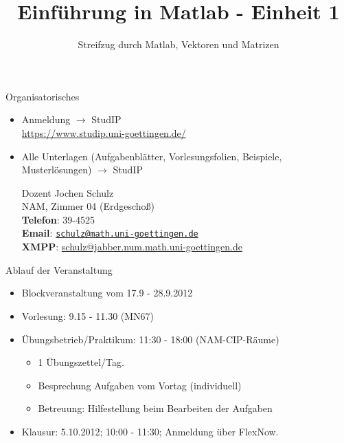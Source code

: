 \documentclass[hyperref={xetex}]{beamer}
\title{Einführung in Matlab - Einheit 1}
\subtitle{Streifzug durch Matlab, Vektoren und Matrizen}
\begin{document}
\titlepage


\begin{frame}{Organisatorisches}
\begin{itemize}
\item Anmeldung $\rightarrow$ StudIP \\
      \url{https://www.studip.uni-goettingen.de/}

{\color{blue}{Einführung in Matlab (Mathematische Anwendersysteme)}}
\item Alle Unterlagen (Aufgabenblätter, Vorlesungsfolien, Beispiele, Musterlösungen) $\rightarrow$ StudIP
\pause
\begin{block}{Dozent}
Jochen Schulz\\
NAM, Zimmer 04 (Erdgescho{\ss})\\
\textbf{Telefon}: 39-4525\\
\textbf{Email}: \href{mailto:schulz@math.uni-goettingen.de}{\texttt{schulz@math.uni-goettingen.de}}\\
\textbf{XMPP}: \url{schulz@jabber.num.math.uni-goettingen.de}\\

\end{block}
\end{itemize}
\end{frame}


\begin{frame}{Ablauf der Veranstaltung}
\begin{itemize}
\item Blockveranstaltung vom  17.9 - 28.9.2012
\item \alert{Vorlesung:} 9.15 - 11.30  (MN67)
\item \alert{Übungsbetrieb/Praktikum}: 11:30 - 18:00  (NAM-CIP-Räume)
\begin{itemize}
\item 1 Übungszettel/Tag.
\item Besprechung Aufgaben vom Vortag (individuell)
\item Betreuung: Hilfestellung beim Bearbeiten der Aufgaben
\end{itemize}
\item \alert{Klausur:} 5.10.2012; 10:00 - 11:30; Anmeldung über FlexNow.
\end{itemize}

\end{frame}
\end{document}
